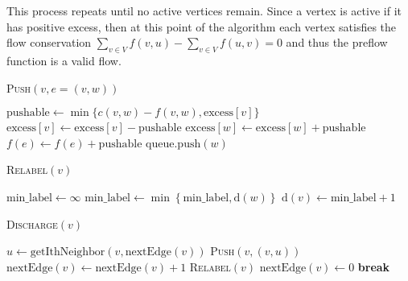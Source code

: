This process repeats until no active vertices remain. Since a vertex is active if it has positive excess, then at this point of the algorithm each vertex satisfies the flow conservation $ \sum_{v \in V} f(v,u)  - \sum_{v \in V} f(u,v) = 0$ and thus the preflow function is a valid flow.


\begin{algorithm}[H]
\caption{\textsc{Push}$(v, e = (v, w))$}
\begin{algorithmic}[1]
\State $\text{pushable} \gets \min\{c(v, w) - f(v, w), \text{excess}[v]\}$
\State $\text{excess}[v] \gets \text{excess}[v] - \text{pushable}$
\State $\text{excess}[w] \gets \text{excess}[w] + \text{pushable}$
\State $f(e) \gets f(e) + \text{pushable}$
    \State $\text{queue}.\text{push}(w)$
\EndIf
\end{algorithmic}
\end{algorithm}

\begin{algorithm}[H]
\caption{\textsc{Relabel}$(v)$}
\begin{algorithmic}[1]
\State $\text{min\_label} \gets \infty$
        \State $\text{min\_label} \gets \min \left\lbrace \text{min\_label}, \text{d}(w) \right\rbrace$
    \EndIf
\EndFor
{}
    \State $\text{d}(v) \gets \text{min\_label} + 1$
\EndIf
\end{algorithmic}
\end{algorithm}

\begin{algorithm}[H]
\caption{\textsc{Discharge}$(v)$}
\begin{algorithmic}[1]
     
        \State $u \gets \text{getIthNeighbor}(v, \text{nextEdge}(v))$
            \State \textsc{Push}$(v, (v, u))$
                \State \Return
            \EndIf
        \EndIf
        \State $\text{nextEdge}(v) \gets \text{nextEdge}(v) + 1$
    \EndWhile
    \State \textsc{Relabel}$(v)$
    \State $\text{nextEdge}(v) \gets 0$
        \State \textbf{break}
    \EndIf
\EndWhile
\end{algorithmic}
\end{algorithm}

